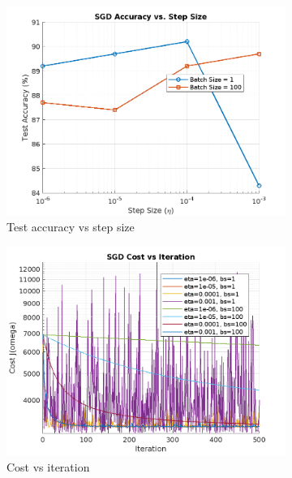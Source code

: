 \documentclass{article}
\begin{document}
\begin{figure}[H]
  \centering
  \begin{subfigure}[b]{0.3\textwidth}
    \centering
    \includegraphics[width=\textwidth]{images/sgd_accuracy_vs_step_size.png}
    \caption{Test accuracy vs step size}
    \label{fig:step_size_acc_sgd}
  \end{subfigure}
  \begin{subfigure}[b]{0.3\textwidth}
    \centering
    \includegraphics[width=\textwidth]{images/sgd_cost_vs_iteration.png}
    \caption{Cost vs iteration}
    \label{fig:sgd_cost}
  \end{subfigure}
  \begin{subfigure}[b]{0.3\textwidth}
    \centering

\end{subfigure}
\end{figure}
\end{document}
